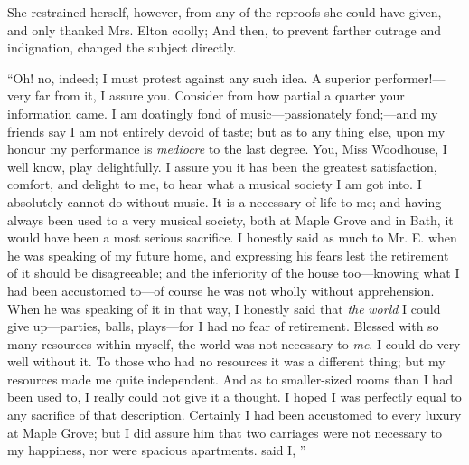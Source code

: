 She restrained herself, however, from any of the reproofs she could have given, and only thanked Mrs. Elton coolly;  And then, to prevent farther outrage and indignation, changed the subject directly.


“Oh! no, indeed; I must protest against any such idea. A superior performer!---very far from it, I assure you. Consider from how partial a quarter your information came. I am doatingly fond of music---passionately fond;---and my friends say I am not entirely devoid of taste; but as to any thing else, upon my honour my performance is {\em mediocre} to the last degree. You, Miss Woodhouse, I well know, play delightfully. I assure you it has been the greatest satisfaction, comfort, and delight to me, to hear what a musical society I am got into. I absolutely cannot do without music. It is a necessary of life to me; and having always been used to a very musical society, both at Maple Grove and in Bath, it would have been a most serious sacrifice. I honestly said as much to Mr. E. when he was speaking of my future home, and expressing his fears lest the retirement of it should be disagreeable; and the inferiority of the house too---knowing what I had been accustomed to---of course he was not wholly without apprehension. When he was speaking of it in that way, I honestly said that {\em the} {\em world} I could give up---parties, balls, plays---for I had no fear of retirement. Blessed with so many resources within myself, the world was not necessary to {\em me}. I could do very well without it. To those who had no resources it was a different thing; but my resources made me quite independent. And as to smaller-sized rooms than I had been used to, I really could not give it a thought. I hoped I was perfectly equal to any sacrifice of that description. Certainly I had been accustomed to every luxury at Maple Grove; but I did assure him that two carriages were not necessary to my happiness, nor were spacious apartments.  said I, ”

